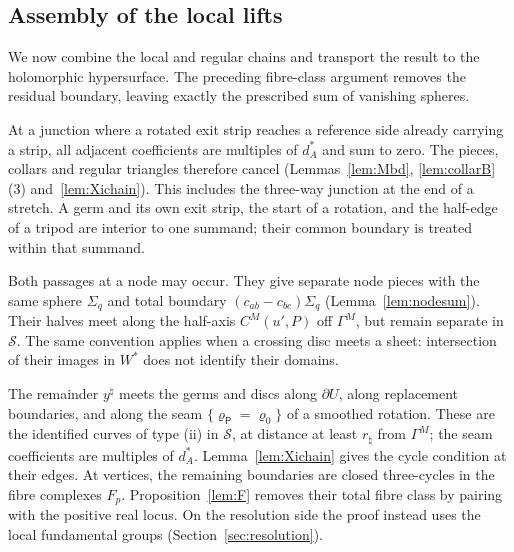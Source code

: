 \subsection{Assembly of the local lifts}\label{ssec:lift-assembly}

We now combine the local and regular chains and transport the result to the holomorphic hypersurface.
The preceding fibre-class argument removes the residual boundary, leaving exactly the prescribed sum of vanishing spheres.

\begin{remark}\label{rem:summands-meet}
At a junction where a rotated exit strip reaches a reference side already carrying a strip, all adjacent coefficients
are multiples of $d^*_A$ and sum to zero. The pieces, collars and regular triangles therefore cancel
(Lemmas~\ref{lem:Mbd}, \ref{lem:collarB}(3) and~\ref{lem:Xichain}). This includes the three-way junction at the end of a
stretch. A germ and its own exit strip, the start of a rotation, and the half-edge of a tripod are interior to one
summand; their common boundary is treated within that summand.

Both passages at a node may occur. They give separate node pieces with the same sphere $\Sigma_q$ and total boundary
$(c_{ab}-c_{bc})\Sigma_q$ (Lemma~\ref{lem:nodesum}). Their halves meet along the half-axis $C^M(u',P)$ off
$\Gamma^M$, but remain separate in $\mathscr S$. The same convention applies when a crossing disc meets a sheet:
intersection of their images in $W^*$ does not identify their domains.

The remainder $y^\natural$ meets the germs and discs along $\partial U$, along replacement boundaries, and along the
seam $\{\varrho_{\mathsf P}=\varrho_0\}$ of a smoothed rotation. These are the identified curves of type (ii) in
$\mathscr S$, at distance at least $r_\natural$ from $\Gamma^M$; the seam coefficients are multiples of $d^*_A$.
Lemma~\ref{lem:Xichain} gives the cycle condition at their edges. At vertices, the remaining boundaries are closed
three-cycles in the fibre complexes $F_p$. Proposition~\ref{lem:F} removes their total fibre class by pairing with the
positive real locus. On the resolution side the proof instead uses the local fundamental groups
(Section~\ref{sec:resolution}).
\end{remark}

